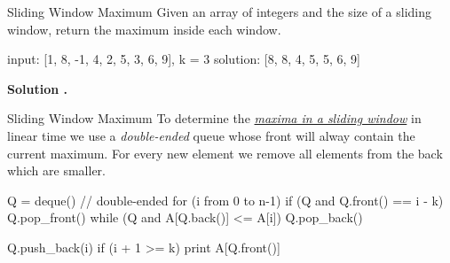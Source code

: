 \documentclass{cognito}
\begin{document}
\begin{note}{Sliding Window Maximum}
	Given an array of integers  and the size  of a sliding window,
	return the maximum inside each window.

	\begin{largecode}
 input: [1, 8, -1, 4, 2, 5, 3, 6, 9], k = 3
 solution: [8, 8, 4, 5, 5, 6, 9]
	\end{largecode}
	\bf Solution \hyperref[note:Sliding Window Maximum Algorithm]{\solutionref}.
\end{note}

\begin{note}{Sliding Window Maximum}
	To determine the \hyperref[note:Sliding Window Maximum]{\it maxima in a sliding window} in linear time we
	use a \emph{double-ended} queue  whose front will alway contain the current maximum.
	For every new element  we remove all elements from the back which are smaller.

	\begin{largecode}
 Q = deque()  // double-ended
 for (i from 0 to n-1)
 	if (Q and Q.front() == i - k) Q.pop_front()
	while (Q and A[Q.back()] <= A[i]) Q.pop_back()
	
	Q.push_back(i)
	if (i + 1 >= k) print A[Q.front()]
	\end{largecode}
	\vspace{-5pt}
\end{note}
\end{document}
